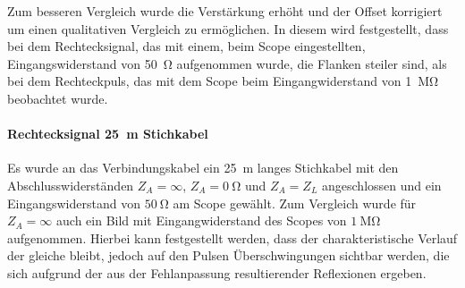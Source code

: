 \documentclass[a4paper,twoside,final]{article}
\begin{document}
Zum besseren Vergleich wurde die Verstärkung erhöht und der Offset korrigiert um einen qualitativen Vergleich zu ermöglichen. In diesem wird festgestellt, dass bei dem Rechtecksignal, das mit einem, beim Scope eingestellten, Eingangswiderstand von \SI{50}{\ohm} aufgenommen wurde, die Flanken steiler sind, als bei dem Rechteckpuls, das mit dem Scope beim Eingangwiderstand von \SI{1}{\mega\ohm} beobachtet wurde.

\paragraph{Rechtecksignal \SI{25}{\metre} Stichkabel}\label{par:Stichkabel}
Es wurde an das Verbindungskabel ein \SI{25}{\metre} langes Stichkabel mit den Abschlusswiderständen $Z_A = \infty $, $Z_A = \SI{0}{\ohm}$ und $Z_A = Z_L$ angeschlossen und ein Eingangswiderstand von $\SI{50}{\ohm}$ am Scope gewählt. Zum Vergleich wurde für $Z_A = \infty$ auch ein Bild mit Eingangwiderstand des Scopes von $\SI{1}{\mega\ohm}$ aufgenommen. Hierbei kann festgestellt werden, dass der charakteristische Verlauf der gleiche bleibt, jedoch auf den Pulsen Überschwingungen sichtbar werden, die sich aufgrund der aus der Fehlanpassung resultierender Reflexionen ergeben.
\end{document}

